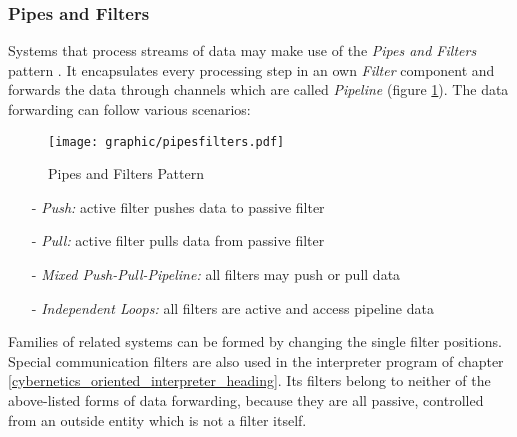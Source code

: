 %
%
%
%
%
%
%

\subsubsection{Pipes and Filters}
\label{pipes_and_filters_heading}

Systems that process streams of data may make use of the \emph{Pipes and Filters}
pattern \cite{buschmann}. It encapsulates every processing step in an own
\emph{Filter} component and forwards the data through channels which are called
\emph{Pipeline} (figure \ref{pipesfilters_figure}). The data forwarding can
follow various scenarios:

\begin{figure}[ht]
    \begin{center}
        \texttt{[image: graphic/pipesfilters.pdf]}
        \caption{Pipes and Filters Pattern}
        \label{pipesfilters_figure}
    \end{center}
\end{figure}

\begin{itemize}
    \item[-] \emph{Push:} active filter pushes data to passive filter
    \item[-] \emph{Pull:} active filter pulls data from passive filter
    \item[-] \emph{Mixed Push-Pull-Pipeline:} all filters may push or pull data
    \item[-] \emph{Independent Loops:} all filters are active and access pipeline data
\end{itemize}

Families of related systems can be formed by changing the single filter
positions. Special communication filters are also used in the interpreter
program of chapter \ref{cybernetics_oriented_interpreter_heading}. Its filters
belong to neither of the above-listed forms of data forwarding, because they
are all passive, controlled from an outside entity which is not a filter
itself.
